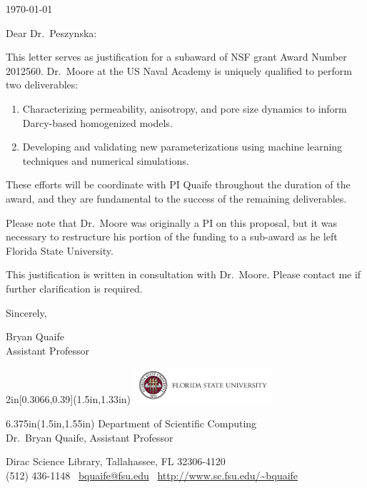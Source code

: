 \documentclass{article}
\begin{document}
\today
\bigskip

Dear Dr.~Peszynska:

This letter serves as justification for a subaward of NSF grant Award
Number 2012560. Dr.~Moore at the US Naval Academy is uniquely qualified
to perform two deliverables:
\begin{enumerate}
  \item Characterizing permeability, anisotropy, and pore size dynamics
    to inform Darcy-based homogenized models.
  \item Developing and validating new parameterizations using machine
    learning techniques and numerical simulations.
\end{enumerate}
These efforts will be coordinate with PI Quaife throughout the duration
of the award, and they are fundamental to the success of the remaining
deliverables.

Please note that Dr.~Moore was originally a PI on this proposal, but it
was necessary to restructure his portion of the funding to a sub-award
as he left Florida State University. 

This justification is written in consultation with Dr.~Moore. Please
contact me if further clarification is required.

Sincerely,
\vspace{2\baselineskip}

Bryan Quaife \\
Assistant Professor


\begin{textblock*}{2in}[0.3066,0.39](1.5in,1.33in)
\includegraphics[width=2in]{fsu_logo}
\end{textblock*}
\begin{textblock*}{6.375in}(1.5in,1.55in)
\sffamily
\hfill \color{fsugarnet} Department of Scientific Computing \\
\hfill Dr.~Bryan Quaife,
Assistant Professor
\end{textblock*}

\vfill
{\footnotesize\color{fsugarnet} Dirac Science Library, Tallahassee, FL
32306-4120 \\
[-0.1\baselineskip]
(512) 436-1148 \textbullet\
\url{bquaife@fsu.edu}
\textbullet\
\url{http://www.sc.fsu.edu/~bquaife}
}
\end{document}
